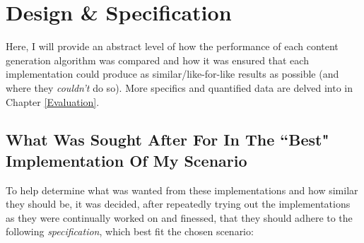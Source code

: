 \chapter{Design \& Specification} \label{Design}
  
% 

Here, I will provide an abstract level of how the performance of each content generation algorithm was compared and how it was ensured that each implementation could produce as similar/like-for-like results as possible (and where they \textit{couldn't} do so). More specifics and quantified data are delved into in Chapter \ref{Evaluation}.

\section{What Was Sought After For In The ``Best" Implementation Of My Scenario}

To help determine what was wanted from these implementations and how similar they should be, it was decided, after repeatedly trying out the implementations as they were continually worked on and finessed, that they should adhere to the following \textit{specification}, which best fit the chosen scenario:


